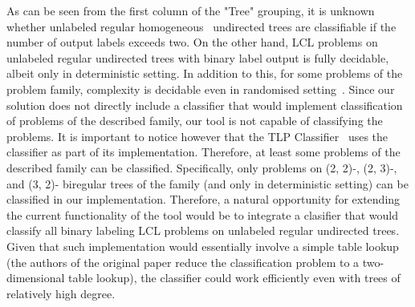 As can be seen from the first column of the "Tree" grouping, it is unknown whether
unlabeled regular homogeneous~\cite{BalliuHomogeneous}
undirected trees are classifiable if the number of
output labels exceeds two. On the other hand, LCL problems on
unlabeled regular undirected trees with binary label output is fully decidable, albeit
only in deterministic setting. In addition to this, for some problems of the problem family,
complexity is decidable even in randomised setting~\cite{Balliu2019c}.
Since our solution does not directly include a classifier that would implement
classification of problems of the described family, our tool is not capable of
classifying the problems. It is important to notice however that the TLP
Classifier~\cite{Rocher2020clas} uses the classifier as part of its implementation.
Therefore, at least some problems of the described family can be classified. Specifically,
only problems on (2, 2)-, (2, 3)-, and (3, 2)- biregular trees of the family
(and only in deterministic setting) can be classified in our implementation.
Therefore, a natural opportunity for extending the current functionality of the tool
would be to integrate a clasifier that would classify all binary labeling LCL problems
on unlabeled regular undirected trees. Given that such implementation would
essentially involve a simple table lookup (the authors of the original paper
reduce the classification problem to a two-dimensional table lookup), the
classifier could work efficiently even with trees of relatively high degree.















